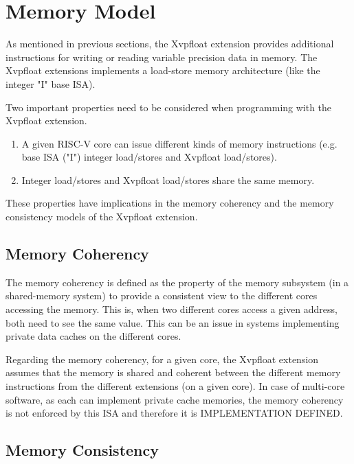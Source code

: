 \chapter{Memory Model}
\label{sec:mem_model}

As mentioned in previous sections, the Xvpfloat extension provides additional instructions for writing or reading variable precision data in memory. 
The Xvpfloat extensions implements a load-store memory architecture (like the integer "I" base ISA).

Two important properties need to be considered when programming with the Xvpfloat extension.

\begin{enumerate}
    \item A given RISC-V core can issue different kinds of memory instructions (e.g. base ISA ("I") integer load/stores and Xvpfloat load/stores).
    \item Integer load/stores and Xvpfloat load/stores share the same memory.
\end{enumerate}

These properties have implications in the memory coherency and the memory consistency models of the Xvpfloat extension.

\section{Memory Coherency}
\label{sec:mem_coherency}

The memory coherency is defined as the property of the memory subsystem (in a shared-memory system) to provide a consistent view to the different cores accessing the memory. 
This is, when two different cores access a given address, both need to see the same value. 
This can be an issue in systems implementing private data caches on the different cores.

Regarding the memory coherency, for a given core, the Xvpfloat extension assumes that the memory is shared and coherent between the different memory instructions from the different extensions (on a given core). 
In case of multi-core software, as each can implement private cache memories, the memory coherency is not enforced by this ISA and therefore it is IMPLEMENTATION DEFINED.

\section{Memory Consistency}
\label{sec:mem_consistency}

